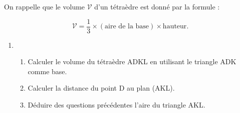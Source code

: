 On rappelle que le volume $\mathcal{V}$ d'un tétraèdre est donné par la formule : 

\[\mathcal{V} = \dfrac{1}{3}\times  (\text{aire de la base}) \times \text{hauteur}.\]

\begin{enumerate}[resume]
\item 
	\begin{enumerate}
		\item Calculer le volume du tétraèdre ADKL en utilisant le triangle ADK comme base. 
		\item Calculer la distance du point D au plan (AKL).
		\item Déduire des questions précédentes l'aire du triangle AKL.
	\end{enumerate}
\end{enumerate}

\bigskip


